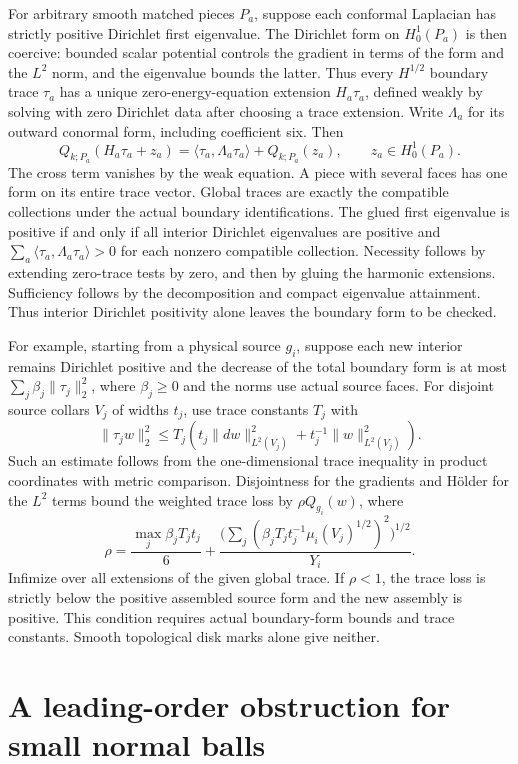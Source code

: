 \documentclass[11pt,letterpaper]{article}
\numberwithin{equation}{section}
\theoremstyle{remark}
\begin{document}
For arbitrary smooth matched pieces \(P_a\), suppose each
conformal Laplacian has strictly positive Dirichlet first
eigenvalue. The Dirichlet form on \(H^1_0(P_a)\) is then coercive:
bounded scalar potential controls the gradient in terms of the
form and the \(L^2\) norm, and the eigenvalue bounds the latter.
Thus every \(H^{1/2}\) boundary trace \(\tau_a\) has a unique
zero-energy-equation extension \(H_a\tau_a\), defined weakly by
solving with zero Dirichlet data after choosing a trace extension.
Write \(\Lambda_a\) for its outward conormal form, including
coefficient six. Then
\[
 Q_{k;P_a}(H_a\tau_a+z_a)=
 \langle\tau_a,\Lambda_a\tau_a\rangle+Q_{k;P_a}(z_a),
 \qquad z_a\in H^1_0(P_a).
\]
The cross term vanishes by the weak equation. A piece with
several faces has one form on its entire trace vector. Global
traces are exactly the compatible collections under the actual
boundary identifications. The glued first eigenvalue is positive
if and only if all interior Dirichlet eigenvalues are positive
and \(\sum_a\langle\tau_a,\Lambda_a\tau_a\rangle>0\) for each
nonzero compatible collection. Necessity follows by extending
zero-trace tests by zero, and then by gluing the harmonic extensions.
Sufficiency follows by the decomposition and compact eigenvalue
attainment. Thus interior Dirichlet positivity alone leaves the
boundary form to be checked.

For example, starting from a physical source \(g_i\), suppose
each new interior remains Dirichlet positive and the decrease of
the total boundary form is at most \(\sum_j\beta_j\|\tau_j\|_2^2\),
where \(\beta_j\ge0\) and the norms use actual source faces.
For disjoint source collars \(V_j\) of widths \(t_j\), use trace
constants \(T_j\) with
\[
 \|\tau_j w\|_2^2\le T_j\left(t_j\|dw\|_{L^2(V_j)}^2+
                   t_j^{-1}\|w\|_{L^2(V_j)}^2\right).
\]
Such an estimate follows from the one-dimensional trace
inequality in product coordinates with metric comparison.
Disjointness for the gradients and H\"older for the \(L^2\)
terms bound the weighted trace loss by \(\rho Q_{g_i}(w)\), where
\[
 \rho=\frac{\max_j\beta_jT_jt_j}{6}
       +\frac{\big(\sum_j(\beta_jT_jt_j^{-1}\mu_i(V_j)^{1/2})^2\big)^{1/2}}{Y_i}.
\]
Infimize over all extensions of the given global trace. If
\(\rho<1\), the trace loss is strictly below the positive
assembled source form and the new assembly is positive. This
condition requires actual boundary-form bounds and trace
constants. Smooth topological disk marks alone give neither.

\section{A leading-order obstruction for small normal balls}
\end{document}
